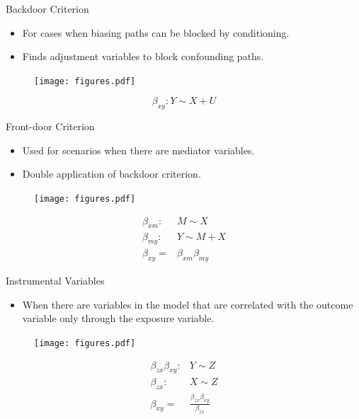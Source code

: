 \documentclass{beamer}
\begin{document}
\begin{frame}{Backdoor Criterion}
	\begin{itemize}
		\item For cases when biasing paths can be blocked by conditioning.
		\item Finds adjustment variables to block confounding paths.
	\end{itemize}
	\begin{figure}
		\centering
		\texttt{[image: figures.pdf]}
	\end{figure}

	$$ \beta_{xy}: Y \sim X + U $$

\end{frame}

\begin{frame}{Front-door Criterion}
	\begin{itemize}
		\item Used for scenarios when there are mediator variables.
		\item Double application of backdoor criterion.
	\end{itemize}
	\begin{figure}
		\centering
		\texttt{[image: figures.pdf]}
	\end{figure}

	\begin{equation*}
		\begin{split}
			\beta_{xm}:& M \sim X \\
			\beta_{my}:& Y \sim M + X \\
			\beta_{xy} =& \beta_{xm}\beta_{my}
		\end{split}
	\end{equation*}

\end{frame}

\begin{frame}{Instrumental Variables}
	\begin{itemize}
		\item When there are variables in the model that are correlated
			with the outcome variable only through the exposure
			variable.
	\end{itemize}
	\begin{figure}
		\centering
		\texttt{[image: figures.pdf]}
	\end{figure}
	\begin{equation*}
		\begin{split}
			\beta_{zx} \beta_{xy}:& Y \sim Z \\
			\beta_{zx}:& X \sim Z \\
			\beta_{xy} =& \frac{\beta_{zx}\beta_{xy}}{\beta_{zx}} \\
		\end{split}
	\end{equation*}
\end{frame}
\end{document}
